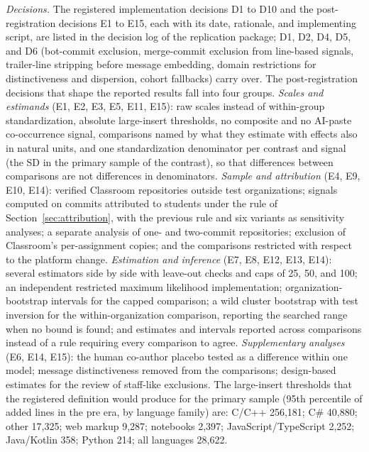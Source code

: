 \documentclass[acmsmall,screen,review,anonymous]{acmart}
\begin{document}
\textit{Decisions.} The registered implementation decisions D1 to D10 and the post-registration decisions E1 to E15, each with its date, rationale, and implementing script, are listed in the decision log of the replication package; D1, D2, D4, D5, and D6 (bot-commit exclusion, merge-commit exclusion from line-based signals, trailer-line stripping before message embedding, domain restrictions for distinctiveness and dispersion, cohort fallbacks) carry over. The post-registration decisions that shape the reported results fall into four groups.
\textit{Scales and estimands} (E1, E2, E3, E5, E11, E15): raw scales instead of within-group standardization, absolute large-insert thresholds, no composite and no AI-paste co-occurrence signal, comparisons named by what they estimate with effects also in natural units, and one standardization denominator per contrast and signal (the SD in the primary sample of the contrast), so that differences between comparisons are not differences in denominators.
\textit{Sample and attribution} (E4, E9, E10, E14): verified Classroom repositories outside test organizations; signals computed on commits attributed to students under the rule of Section~\ref{sec:attribution}, with the previous rule and six variants as sensitivity analyses; a separate analysis of one- and two-commit repositories; exclusion of Classroom's per-assignment copies; and the comparisons restricted with respect to the platform change.
\textit{Estimation and inference} (E7, E8, E12, E13, E14): several estimators side by side with leave-out checks and caps of 25, 50, and 100; an independent restricted maximum likelihood implementation; organization-bootstrap intervals for the capped comparison; a wild cluster bootstrap with test inversion for the within-organization comparison, reporting the searched range when no bound is found; and estimates and intervals reported across comparisons instead of a rule requiring every comparison to agree.
\textit{Supplementary analyses} (E6, E14, E15): the human co-author placebo tested as a difference within one model; message distinctiveness removed from the comparisons; design-based estimates for the review of staff-like exclusions.
The large-insert thresholds that the registered definition would produce for the primary sample (95th percentile of added lines in the pre era, by language family) are: C/C++ 256,181; C\# 40,880; other 17,325; web markup 9,287; notebooks 2,397; JavaScript/TypeScript 2,252; Java/Kotlin 358; Python 214; all languages 28,622.
\end{document}
